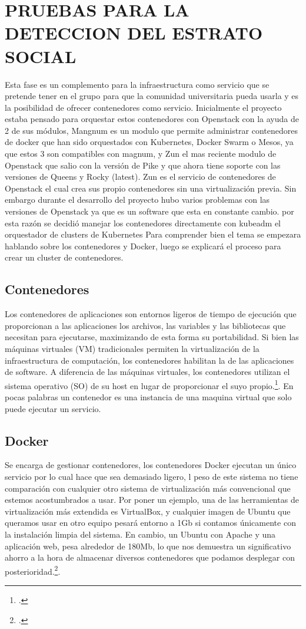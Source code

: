     \section{PRUEBAS PARA LA DETECCION DEL ESTRATO SOCIAL}
    Esta fase es un complemento para la infraestructura como servicio que se pretende tener en el grupo para que la comunidad universitaria pueda usarla y es la posibilidad de ofrecer contenedores como servicio. Inicialmente el proyecto estaba pensado para orquestar estos contenedores con Openstack con la ayuda de 2 de sus módulos, Mangnum es un modulo que permite administrar contenedores de docker que han sido orquestados con Kubernetes, Docker Swarm o Mesos, ya que estos 3 son compatibles con magnum, y Zun el mas reciente modulo de Openstack que salio con la versión de Pike y que ahora tiene soporte con las versiones de Queens y Rocky (latest). Zun es el servicio de contenedores de Openstack el cual crea sus propio contenedores sin una virtualización previa. Sin embargo durante el desarrollo del proyecto hubo varios problemas con las versiones de  Openstack ya que es un software que esta en constante cambio. por esta razón se decidió manejar los contenedores directamente con kubeadm el orquestador de clusters de Kubernetes Para comprender bien el tema se empezara hablando sobre los contenedores y Docker, luego se explicará el proceso para crear un cluster de contenedores.
    
    \subsection{Contenedores}
    Los contenedores de aplicaciones son entornos ligeros de tiempo de ejecución que proporcionan a las aplicaciones los archivos, las variables y las bibliotecas que necesitan para ejecutarse, maximizando de esta forma su portabilidad. Si bien las máquinas virtuales (VM) tradicionales permiten la virtualización de la infraestructura de computación, los contenedores habilitan la de las aplicaciones de software. A diferencia de las máquinas virtuales, los contenedores utilizan el sistema operativo (SO) de su host en lugar de proporcionar el suyo propio.\footcite[][]{hpe-contenedore}. En pocas palabras un contenedor es una instancia de una maquina virtual que solo puede ejecutar un servicio.
    
    \subsection{Docker}
    Se encarga de gestionar contenedores, los contenedores Docker ejecutan un único servicio por lo cual hace que sea demasiado ligero, l peso de este sistema no tiene comparación con cualquier otro sistema de virtualización más convencional que estemos acostumbrados a usar. Por poner un ejemplo, una de las herramientas de virtualización más extendida es VirtualBox, y cualquier imagen de Ubuntu que queramos usar en otro equipo pesará entorno a 1Gb si contamos únicamente con la instalación limpia del sistema. En cambio, un Ubuntu con Apache y una aplicación web, pesa alrededor de 180Mb, lo que nos demuestra un significativo ahorro a la hora de almacenar diversos contenedores que podamos desplegar con posterioridad.\footcite[][]{openwebinars}.
    
